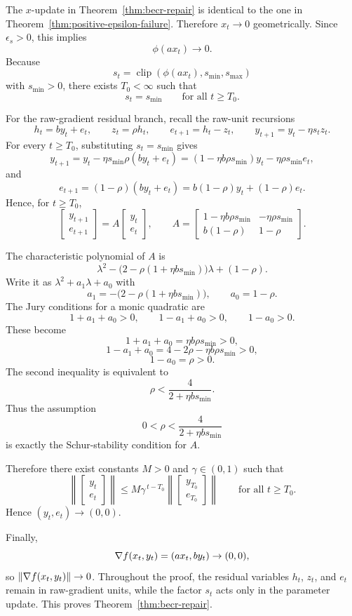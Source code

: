 The $x$-update in Theorem~\ref{thm:becr-repair} is identical to the one in
Theorem~\ref{thm:positive-epsilon-failure}. Therefore $x_t\to 0$
geometrically. Since $\epsilon_s>0$, this implies
\[
\phi(a x_t)\to 0.
\]
Because
\[
s_t=\operatorname{clip}\!\left(\phi(a x_t),s_{\min},s_{\max}\right)
\]
with $s_{\min}>0$, there exists $T_0<\infty$ such that
\[
s_t=s_{\min}\qquad\text{for all }t\ge T_0.
\]

For the raw-gradient residual branch, recall the raw-unit recursions
\[
h_t=b y_t+e_t,\qquad
z_t=\rho h_t,\qquad
e_{t+1}=h_t-z_t,\qquad
y_{t+1}=y_t-\eta s_t z_t.
\]
For every $t\ge T_0$, substituting $s_t=s_{\min}$ gives
\[
y_{t+1}
=
y_t-\eta s_{\min}\rho (b y_t+e_t)
=
(1-\eta b\rho s_{\min})y_t-\eta \rho s_{\min} e_t,
\]
and
\[
e_{t+1}
=
(1-\rho)(b y_t+e_t)
=
b(1-\rho)y_t+(1-\rho)e_t.
\]
Hence, for $t\ge T_0$,
\[
\begin{bmatrix}
y_{t+1}\\ e_{t+1}
\end{bmatrix}
=
A
\begin{bmatrix}
y_t\\ e_t
\end{bmatrix},
\qquad
A=
\begin{bmatrix}
1-\eta b\rho s_{\min} & -\eta \rho s_{\min}\\
b(1-\rho) & 1-\rho
\end{bmatrix}.
\]

The characteristic polynomial of $A$ is
\[
\lambda^2
-
\bigl(2-\rho(1+\eta b s_{\min})\bigr)\lambda
+
(1-\rho).
\]
Write it as $\lambda^2+a_1\lambda+a_0$ with
\[
a_1=-\bigl(2-\rho(1+\eta b s_{\min})\bigr),
\qquad
a_0=1-\rho.
\]
The Jury conditions for a monic quadratic are
\[
1+a_1+a_0>0,\qquad
1-a_1+a_0>0,\qquad
1-a_0>0.
\]
These become
\[
1+a_1+a_0=\eta b\rho s_{\min}>0,
\]
\[
1-a_1+a_0=4-2\rho-\eta b\rho s_{\min}>0,
\]
\[
1-a_0=\rho>0.
\]
The second inequality is equivalent to
\[
\rho<\frac{4}{2+\eta b s_{\min}}.
\]
Thus the assumption
\[
0<\rho<\frac{4}{2+\eta b s_{\min}}
\]
is exactly the Schur-stability condition for $A$.

Therefore there exist constants $M>0$ and $\gamma\in(0,1)$ such that
\[
\left\|
\begin{bmatrix}
y_t\\ e_t
\end{bmatrix}
\right\|
\le
M\gamma^{\,t-T_0}
\left\|
\begin{bmatrix}
y_{T_0}\\ e_{T_0}
\end{bmatrix}
\right\|
\qquad\text{for all }t\ge T_0.
\]
Hence $(y_t,e_t)\to(0,0)$.

Finally,
\[
\nabla f(x_t,y_t)=(a x_t,b y_t)\to (0,0),
\]
so $\left\lVert \nabla f(x_t,y_t) \right\rVert\to 0$. Throughout the proof, the residual
variables $h_t$, $z_t$, and $e_t$ remain in raw-gradient units, while the
factor $s_t$ acts only in the parameter update. This proves
Theorem~\ref{thm:becr-repair}.
